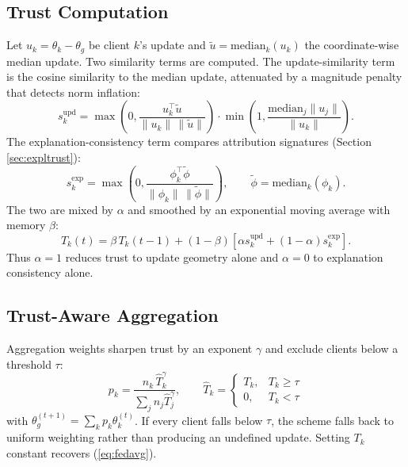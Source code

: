 \documentclass[10pt,twocolumn,letterpaper]{article}
\begin{document}
\subsection{Trust Computation}
Let $u_k = \theta_k - \theta_g$ be client $k$'s update and
$\tilde{u} = \mathrm{median}_k(u_k)$ the coordinate-wise median update. Two
similarity terms are computed. The update-similarity term is the cosine
similarity to the median update, attenuated by a magnitude penalty that
detects norm inflation:
\begin{equation}
 s^{\mathrm{upd}}_k = \max\!\left(0, \frac{u_k^{\top}\tilde{u}}
 {\lVert u_k\rVert\,\lVert \tilde{u}\rVert}\right)
 \cdot \min\!\left(1, \frac{\mathrm{median}_j \lVert u_j \rVert}
 {\lVert u_k \rVert}\right).
 \label{eq:supd}
\end{equation}
The explanation-consistency term compares attribution signatures (Section
\ref{sec:expltrust}):
\begin{equation}
 s^{\mathrm{exp}}_k = \max\!\left(0, \frac{\phi_k^{\top}\tilde{\phi}}
 {\lVert \phi_k\rVert\,\lVert \tilde{\phi}\rVert}\right),
 \qquad \tilde{\phi} = \mathrm{median}_k(\phi_k).
 \label{eq:sexp}
\end{equation}
The two are mixed by $\alpha$ and smoothed by an exponential moving average
with memory $\beta$:
\begin{equation}
 T_k(t) = \beta\,T_k(t-1) + (1-\beta)\left[\alpha s^{\mathrm{upd}}_k
 + (1-\alpha) s^{\mathrm{exp}}_k\right].
 \label{eq:trust}
\end{equation}
Thus $\alpha=1$ reduces trust to update geometry alone and $\alpha=0$ to
explanation consistency alone.

\subsection{Trust-Aware Aggregation}
Aggregation weights sharpen trust by an exponent $\gamma$ and exclude clients
below a threshold $\tau$:
\begin{equation}
 p_k = \frac{n_k \, \hat{T}_k^{\gamma}}{\sum_{j} n_j \hat{T}_j^{\gamma}},
 \qquad
 \hat{T}_k = \begin{cases} T_k, & T_k \geq \tau\\ 0, & T_k < \tau
 \end{cases}
 \label{eq:weights}
\end{equation}
with $\theta_g^{(t+1)} = \sum_k p_k \theta_k^{(t)}$. If every client falls
below $\tau$, the scheme falls back to uniform weighting rather than
producing an undefined update. Setting $T_k$ constant recovers
(\ref{eq:fedavg}).
\end{document}
